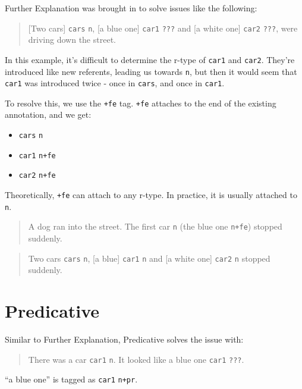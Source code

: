 \documentclass[
]{book}
\providecommand{\tightlist}{%
  \setlength{\itemsep}{0pt}\setlength{\parskip}{0pt}}
\begin{document}
Further Explanation was brought in to solve issues like the following:

\begin{quote}
{[}Two cars{]} \texttt{cars} \texttt{n}, {[}a blue one{]} \texttt{car1} \texttt{???} and {[}a white one{]} \texttt{car2} \texttt{???}, were driving down the street.
\end{quote}

In this example, it's difficult to determine the r-type of \texttt{car1} and \texttt{car2}.
They're introduced like new referents, leading us towards \texttt{n}, but then it would seem that \texttt{car1} was introduced twice -
once in \texttt{cars}, and once in \texttt{car1}.

To resolve this, we use the \texttt{+fe} tag.
\texttt{+fe} attaches to the end of the existing annotation, and we get:

\begin{itemize}
\tightlist
\item
  \texttt{cars} \texttt{n}
\item
  \texttt{car1} \texttt{n+fe}
\item
  \texttt{car2} \texttt{n+fe}
\end{itemize}

Theoretically, \texttt{+fe} can attach to any r-type. In practice, it is usually attached to \texttt{n}.

\begin{quote}
A dog ran into the street. The first car \texttt{n} (the blue one \texttt{n+fe}) stopped suddenly.
\end{quote}

\begin{quote}
Two cars \texttt{cars} \texttt{n}, {[}a blue{]} \texttt{car1} \texttt{n} and {[}a white one{]} \texttt{car2} \texttt{n} stopped suddenly.
\end{quote}

\hypertarget{predicative}{%
\section{Predicative}\label{predicative}}

Similar to Further Explanation, Predicative solves the issue with:

\begin{quote}
There was a car \texttt{car1} \texttt{n}. It looked like a blue one \texttt{car1} \texttt{???}.
\end{quote}

``a blue one'' is tagged as \texttt{car1} \texttt{n+pr}.
\end{document}
